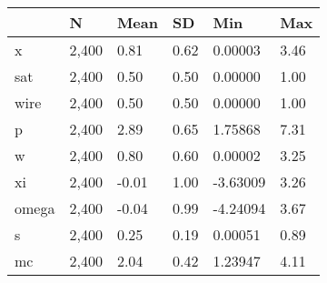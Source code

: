 \begin{table}[htbp]
\begin{tabular}{|l|l|l|l|l|l|}\hline  
 & N  & Mean  & SD  & Min  & Max  \\ \hline  
x &     2,400 &      0.81 &      0.62 &   0.00003 &      3.46 \\ \hline 
sat &     2,400 &      0.50 &      0.50 &   0.00000 &      1.00 \\ \hline 
wire &     2,400 &      0.50 &      0.50 &   0.00000 &      1.00 \\ \hline 
p &     2,400 &      2.89 &      0.65 &   1.75868 &      7.31 \\ \hline 
w &     2,400 &      0.80 &      0.60 &   0.00002 &      3.25 \\ \hline 
xi &     2,400 &     -0.01 &      1.00 &  -3.63009 &      3.26 \\ \hline 
omega &     2,400 &     -0.04 &      0.99 &  -4.24094 &      3.67 \\ \hline 
s &     2,400 &      0.25 &      0.19 &   0.00051 &      0.89 \\ \hline 
mc &     2,400 &      2.04 &      0.42 &   1.23947 &      4.11 \\ \hline 
  \end{tabular}
\end{table}
